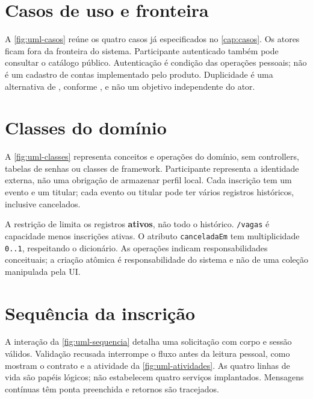 \clearpage
\section{Casos de uso e fronteira}
A \autoref{fig:uml-casos} reúne os quatro casos já especificados no
\autoref{cap:casos}. Os atores ficam fora da fronteira do sistema.
Participante autenticado também pode consultar o catálogo público.
Autenticação é condição das operações pessoais; não é um cadastro de contas
implementado pelo produto. Duplicidade é uma alternativa de ,
conforme , e não um objetivo independente do ator.

  {}

\clearpage
\section{Classes do domínio}
A \autoref{fig:uml-classes} representa conceitos e operações do domínio,
sem controllers, tabelas de senhas ou classes de framework.
Participante representa a identidade externa, não uma obrigação de armazenar
perfil local. Cada inscrição tem um evento e um titular; cada evento ou titular
pode ter vários registros históricos, inclusive cancelados.

  {}

A restrição de  limita os registros \textbf{ativos}, não todo o
histórico. \texttt{/vagas} é capacidade menos inscrições ativas.
O atributo \texttt{canceladaEm} tem multiplicidade \texttt{0..1}, respeitando
o dicionário. As operações indicam responsabilidades conceituais; a criação
atômica é responsabilidade do sistema e não de uma coleção manipulada pela UI.

\clearpage
\section{Sequência da inscrição}
A interação da \autoref{fig:uml-sequencia} detalha uma solicitação com corpo
e sessão válidos. Validação recusada interrompe o fluxo antes da leitura pessoal,
como mostram o contrato e a atividade da \autoref{fig:uml-atividades}.
As quatro linhas de vida são papéis lógicos; não estabelecem quatro serviços
implantados. Mensagens contínuas têm ponta preenchida e retornos são tracejados.

